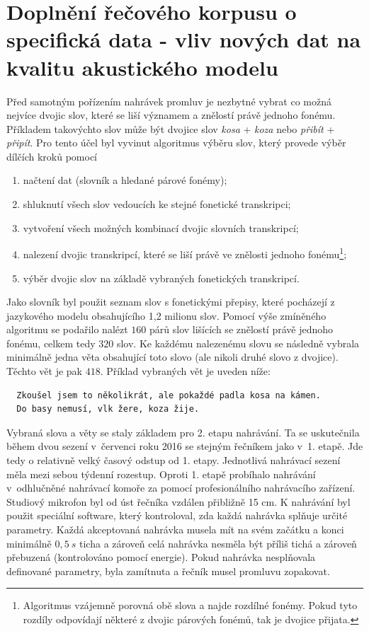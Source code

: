 \section{Doplnění řečového korpusu o specifická data - vliv nových dat na kvalitu akustického modelu}
\label{chap:realisation:corpus}

Před samotným pořízením nahrávek promluv je nezbytné vybrat co možná nejvíce dvojic slov, které se liší významem a znělostí právě jednoho fonému.
Příkladem takovýchto slov může být dvojice slov \textit{kosa} + \textit{koza} nebo \textit{přibít} + \textit{připít}.
Pro tento účel byl vyvinut algoritmus výběru slov, který provede výběr dílčích kroků pomocí

\begin{enumerate}
  \item načtení dat (slovník a hledané párové fonémy);
  \item shluknutí všech slov vedoucích ke stejné fonetické transkripci;
  \item vytvoření všech možných kombinací dvojic slovních transkripcí;
  \item nalezení dvojic transkripcí, které se liší právě ve znělosti jednoho fonému\footnote{Algoritmus vzájemně porovná obě slova a najde rozdílné fonémy. Pokud tyto rozdíly odpovídají některé z dvojic párových fonémů, tak je dvojice přijata.};
  \item výběr dvojic slov na základě vybraných fonetických transkripcí.
\end{enumerate}

\noindent Jako slovník byl použit seznam slov s fonetickými přepisy, které pocházejí z jazykového modelu obsahujícího 1,2 milionu slov.
Pomocí výše zmíněného algoritmu se podařilo nalézt $160$ párů slov lišících se znělostí právě jednoho fonému, celkem tedy $320$ slov.
Ke každému nalezenému slovu se následně vybrala minimálně jedna věta obsahující toto slovo (ale nikoli druhé slovo z dvojice).
Těchto vět je pak $418$. Příklad vybraných vět je uveden níže:

\begin{verbatim}
  Zkoušel jsem to několikrát, ale pokaždé padla kosa na kámen.
  Do basy nemusí, vlk žere, koza žije.
\end{verbatim}

Vybraná slova a věty se staly základem pro 2. etapu nahrávání.
Ta se uskutečnila během dvou sezení v~červenci roku 2016 se stejným řečníkem jako v~1. etapě.
Jde tedy o relativně velký časový odstup od 1. etapy.
Jednotlivá nahrávací sezení měla mezi sebou týdenní rozestup.
Oproti 1. etapě probíhalo nahrávání v~odhlučněné nahrávací komoře za pomocí profesionálního nahrávacího zařízení.
Studiový mikrofon byl od úst řečníka vzdálen přibližně 15 cm.
K nahrávání byl použit speciální software, který kontroloval, zda každá nahrávka splňuje určité parametry.
Každá akceptovaná nahrávka musela mít na svém začátku a konci minimálně $0,5\ s$ ticha a zároveň celá nahrávka nesměla být příliš tichá a zároveň přebuzená (kontrolováno pomocí energie).
Pokud nahrávka nesplňovala definované parametry, byla zamítnuta a řečník musel promluvu zopakovat.

